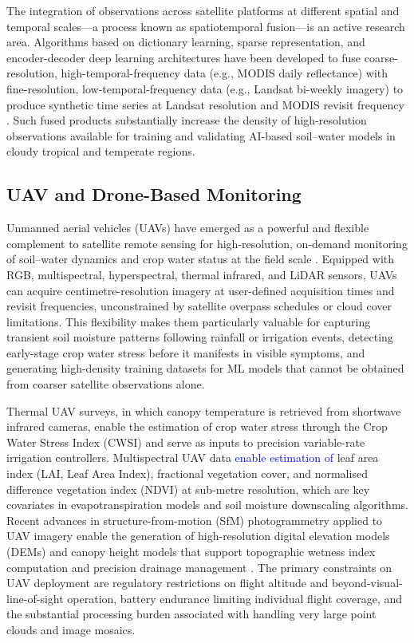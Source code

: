 \documentclass[land,article,submit,pdftex,moreauthors]{Definitions/mdpi}
\numberwithin{equation}{section}
\begin{document}
The integration of observations across satellite platforms at different spatial and temporal scales---a process known as spatiotemporal fusion---is an active research area. Algorithms based on dictionary learning, sparse representation, and encoder-decoder deep learning architectures have been developed to fuse coarse-resolution, high-temporal-frequency data (e.g., MODIS daily reflectance) with fine-resolution, low-temporal-frequency data (e.g., Landsat bi-weekly imagery) to produce synthetic time series at Landsat resolution and MODIS revisit frequency \citep{gao2017blending}. Such fused products substantially increase the density of high-resolution observations available for training and validating AI-based soil--water models in cloudy tropical and temperate regions.

\subsection{UAV and Drone-Based Monitoring}

Unmanned aerial vehicles (UAVs) have emerged as a powerful and flexible complement to satellite remote sensing for high-resolution, on-demand monitoring of soil--water dynamics and crop water status at the field scale \citep{mulla2013twenty}. Equipped with RGB, multispectral, hyperspectral, thermal infrared, and LiDAR sensors, UAVs can acquire centimetre-resolution imagery at user-defined acquisition times and revisit frequencies, unconstrained by satellite overpass schedules or cloud cover limitations. This flexibility makes them particularly valuable for capturing transient soil moisture patterns following rainfall or irrigation events, detecting early-stage crop water stress before it manifests in visible symptoms, and generating high-density training datasets for ML models that cannot be obtained from coarser satellite observations alone.

Thermal UAV surveys, in which canopy temperature is retrieved from shortwave infrared cameras, enable the estimation of crop water stress through the Crop Water Stress Index (CWSI) \citep{jones2004use} and serve as inputs to precision variable-rate irrigation controllers. Multispectral UAV data \textcolor{blue}{enable estimation of} leaf area index (LAI, Leaf Area Index), fractional vegetation cover, and normalised difference vegetation index (NDVI) at sub-metre resolution, which are key covariates in evapotranspiration models and soil moisture downscaling algorithms. Recent advances in structure-from-motion (SfM) photogrammetry applied to UAV imagery enable the generation of high-resolution digital elevation models (DEMs) and canopy height models that support topographic wetness index computation and precision drainage management \citep{yao2019uav}. The primary constraints on UAV deployment are regulatory restrictions on flight altitude and beyond-visual-line-of-sight operation, battery endurance limiting individual flight coverage, and the substantial processing burden associated with handling very large point clouds and image mosaics.
\end{document}
